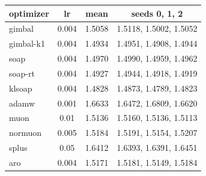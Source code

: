 \begin{tabular}{lccc}
\toprule
optimizer & lr & mean & seeds 0, 1, 2 \\
\midrule
gimbal & 0.004 & 1.5058 & 1.5118, 1.5002, 1.5052 \\
gimbal-k1 & 0.004 & 1.4934 & 1.4951, 1.4908, 1.4944 \\
soap & 0.004 & 1.4970 & 1.4990, 1.4959, 1.4962 \\
soap-rt & 0.004 & 1.4927 & 1.4944, 1.4918, 1.4919 \\
klsoap & 0.004 & 1.4828 & 1.4873, 1.4789, 1.4823 \\
adamw & 0.001 & 1.6633 & 1.6472, 1.6809, 1.6620 \\
muon & 0.01 & 1.5136 & 1.5160, 1.5136, 1.5113 \\
normuon & 0.005 & 1.5184 & 1.5191, 1.5154, 1.5207 \\
splus & 0.05 & 1.6412 & 1.6393, 1.6391, 1.6451 \\
aro & 0.004 & 1.5171 & 1.5181, 1.5149, 1.5184 \\
\bottomrule
\end{tabular}
